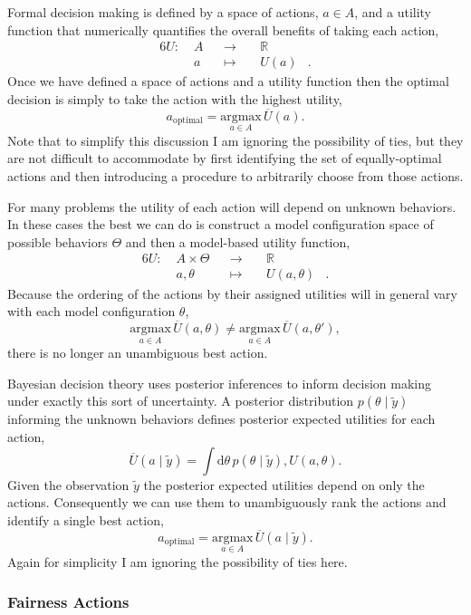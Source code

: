 \documentclass[
  letterpaper,
  DIV=11,
  numbers=noendperiod]{scrartcl}
\begin{document}
Formal decision making is defined by a space of actions, \(a \in A\),
and a utility function that numerically quantifies the overall benefits
of taking each action, \begin{alignat*}{6}
U :\; & A & &\rightarrow& \; & \mathbb{R} &
\\
& a & &\mapsto& & U(a) &.
\end{alignat*} Once we have defined a space of actions and a utility
function then the optimal decision is simply to take the action with the
highest utility, \[
a_{\mathrm{optimal}}
=
\underset{a \in A}{\mathrm{argmax}} \, \overline{U}(a).
\] Note that to simplify this discussion I am ignoring the possibility
of ties, but they are not difficult to accommodate by first identifying
the set of equally-optimal actions and then introducing a procedure to
arbitrarily choose from those actions.

For many problems the utility of each action will depend on unknown
behaviors. In these cases the best we can do is construct a model
configuration space of possible behaviors \(\Theta\) and then a
model-based utility function, \begin{alignat*}{6}
U :\; & A \times \Theta & &\rightarrow& \; & \mathbb{R} &
\\
& a, \theta & &\mapsto& & U(a, \theta) &.
\end{alignat*} Because the ordering of the actions by their assigned
utilities will in general vary with each model configuration \(\theta\),
\[
\underset{a \in A}{\mathrm{argmax}} \, \overline{U}(a, \theta)
\ne
\underset{a \in A}{\mathrm{argmax}} \, \overline{U}(a, \theta'),
\] there is no longer an unambiguous best action.

Bayesian decision theory uses posterior inferences to inform decision
making under exactly this sort of uncertainty. A posterior distribution
\(p(\theta \mid \tilde{y})\) informing the unknown behaviors defines
posterior expected utilities for each action, \[
\overline{U}(a \mid \tilde{y})
=
\int \mathrm{d} \theta \, p(\theta \mid \tilde{y}) , U(a, \theta).
\] Given the observation \(\tilde{y}\) the posterior expected utilities
depend on only the actions. Consequently we can use them to
unambiguously rank the actions and identify a single best action, \[
a_{\mathrm{optimal}}
=
\underset{a \in A}{\mathrm{argmax}} \, \overline{U}(a \mid \tilde{y}).
\] Again for simplicity I am ignoring the possibility of ties here.

\subsubsection{Fairness Actions}\label{sec:actions}
\end{document}
